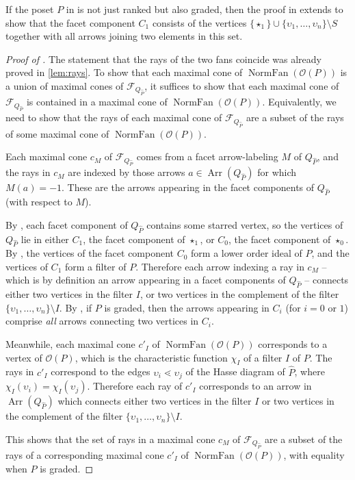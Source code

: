 \documentclass[10pt,a4paper]{amsart}
\newcommand{\Arr}{\operatorname{Arr}}
\newcommand{\F}{\mathcal{F}}
\newcommand{\NF}{\operatorname{NormFan}}
\newcommand{\OO}{\mathcal{O}}
\newcommand{\vv}{\upsilon}
\begin{document}
\begin{remark}\label{rem:graded}
If the poset $P$ in  is not just ranked but also graded,
then the proof in  extends to show that 
the facet component $C_1$ consists of 
the vertices $\{\star_1\} \cup 
\{\vv_1,\dots,\vv_n\} \setminus S $ together with 
all arrows %
joining two elements in this set.
\end{remark}

\begin{proof}[Proof of ]
The statement that the rays of the two fans coincide was already proved in \cref{lem:rays}. To show that each maximal cone of $\NF(\OO(P))$ is a union of maximal cones of 
	$\F_{Q_{\hat{P}}}$, it suffices to show that each maximal
	cone of $\F_{Q_{\hat{P}}}$ is contained
in a maximal cone of $\NF(\OO(P))$. Equivalently, we need to show 
	that the rays of each maximal cone of $\F_{Q_{\hat{P}}}$ 
 are a subset of the rays
of some 
 maximal cone of $\NF(\OO(P))$.

	Each maximal cone $c_M$ of $\F_{Q_{\hat{P}}}$ comes from a facet arrow-labeling $M$
of $Q_{\hat{P}}$, and the rays in $c_M$ are indexed
by those 
 arrows $a\in \Arr(Q_{\hat{P}})$ for which 
$M(a) = -1$. These are the arrows appearing in 
the facet components
of $Q_{\hat{P}}$ (with respect to $M$).

By , each facet component of $Q_{\hat{P}}$
contains some starred vertex, so the vertices of $Q_{\hat{P}}$ 
lie in either $C_1$, the facet component of $\star_1$,
or $C_0$, the facet component of $\star_0$.
By , the vertices of the 
facet component $C_0$ form a lower order ideal of $P$, and the 
vertices of $C_1$ form a filter of $P$.
Therefore each arrow indexing a ray in $c_M$ -- 
which is by definition an arrow appearing in a facet components of $Q_{\hat{P}}$ --
connects either two vertices in the filter $I$, or two vertices
in the complement of the filter $\{\vv_1,\dots,\vv_n\} \setminus I$.
By ,  if $P$ is graded,
then the arrows appearing in $C_i$ (for $i=0$ or $1$)
comprise \emph{all} arrows connecting two vertices in $C_i$.

Meanwhile, each maximal cone $c'_I$ of $\NF(\OO(P))$ 
corresponds to a 
vertex 
 of $\OO(P)$, which is the 
characteristic function $\chi_I$ of a filter $I$ of $P$.
The rays in $c'_I$ correspond to the 
edges $\vv_i \lessdot \vv_j$ of the Hasse diagram of $\hat{P}$,
where $\chi_I(\vv_i) = \chi_I(\vv_j)$.
Therefore each ray of $c'_I$ corresponds to an arrow in $\Arr(Q_{\hat{P}})$
which connects either two vertices in the filter $I$
or two vertices in the complement of the 
filter $\{\vv_1,\dots,\vv_n\} \setminus I$.

This shows that the set of rays in a maximal cone 
$c_M$ 
	of $\F_{Q_{\hat{P}}}$ 
 are a subset of the rays
of a corresponding maximal cone 
 $c'_I$ of $\NF(\OO(P))$, with equality when $P$ is graded.
\end{proof}
\end{document}
